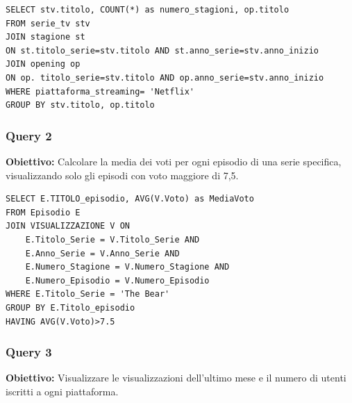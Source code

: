 \documentclass[10pt,a4paper]{article}
\begin{document}
\vspace{0.5cm}



\begin{lstlisting}[caption={Query 1}, label={lst:sql-example}]
SELECT stv.titolo, COUNT(*) as numero_stagioni, op.titolo
FROM serie_tv stv
JOIN stagione st
ON st.titolo_serie=stv.titolo AND st.anno_serie=stv.anno_inizio
JOIN opening op
ON op. titolo_serie=stv.titolo AND op.anno_serie=stv.anno_inizio
WHERE piattaforma_streaming= 'Netflix'
GROUP BY stv.titolo, op.titolo
\end{lstlisting}

\vspace{1cm}

\subsubsection*{Query 2}
\textbf{Obiettivo:} Calcolare la media dei voti per ogni episodio di una serie specifica, visualizzando solo gli episodi con voto maggiore di 7,5.

\vspace{0.5cm}

\begin{lstlisting}[caption={Query 2}, label={lst:sql-example}]
SELECT E.TITOLO_episodio, AVG(V.Voto) as MediaVoto
FROM Episodio E
JOIN VISUALIZZAZIONE V ON
	E.Titolo_Serie = V.Titolo_Serie AND
	E.Anno_Serie = V.Anno_Serie AND
	E.Numero_Stagione = V.Numero_Stagione AND
	E.Numero_Episodio = V.Numero_Episodio
WHERE E.Titolo_Serie = 'The Bear'
GROUP BY E.Titolo_episodio
HAVING AVG(V.Voto)>7.5
\end{lstlisting}

\vspace{1cm}

\subsubsection*{Query 3}
\textbf{Obiettivo:} Visualizzare le visualizzazioni dell'ultimo mese e il numero di utenti iscritti a ogni piattaforma.

\vspace{0.5cm}
\end{document}
